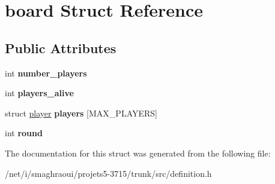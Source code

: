 \hypertarget{structboard}{\section{board Struct Reference}
\label{structboard}
}
\subsection*{Public Attributes}
\begin{DoxyCompactItemize}
\item 
\hypertarget{structboard_a28791e9f03431dbf7da4f0a63314f8a3}{int {\bfseries number\-\_\-players}}\label{structboard_a28791e9f03431dbf7da4f0a63314f8a3}

\item 
\hypertarget{structboard_ae01fffe0d22fd088899964c1622218c2}{int {\bfseries players\-\_\-alive}}\label{structboard_ae01fffe0d22fd088899964c1622218c2}

\item 
\hypertarget{structboard_a034e8d78d5e124484d00db5bfd6dac07}{struct \hyperlink{structplayer}{player} {\bfseries players} \mbox{[}M\-A\-X\-\_\-\-P\-L\-A\-Y\-E\-R\-S\mbox{]}}\label{structboard_a034e8d78d5e124484d00db5bfd6dac07}

\item 
\hypertarget{structboard_a066b3820c178b3d45907f6ce6184b986}{int {\bfseries round}}\label{structboard_a066b3820c178b3d45907f6ce6184b986}

\end{DoxyCompactItemize}


The documentation for this struct was generated from the following file\-:\begin{DoxyCompactItemize}
\item 
/net/i/smaghraoui/projets5-\/3715/trunk/src/definition.\-h\end{DoxyCompactItemize}
